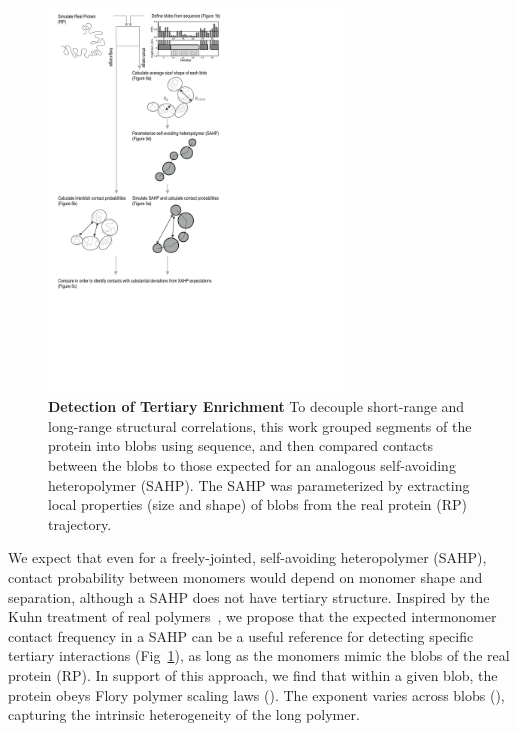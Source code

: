 \documentclass[10pt,letterpaper]{article}
\begin{document}
\begin{figure}[!ht]
\includegraphics[width=0.7\textwidth,trim={0 0cm 0 0cm},clip]{./figures/fig4.pdf}
\caption{{\bf Detection of Tertiary Enrichment } To decouple short-range and long-range structural correlations, this work grouped segments of the protein into blobs using sequence, and then compared contacts between the blobs to those expected for an analogous self-avoiding heteropolymer (SAHP). The SAHP was parameterized by extracting local properties (size and shape) of blobs from the real protein (RP) trajectory.}
\label{fig:schematic}
\end{figure}


We expect that even for a freely-jointed, self-avoiding heteropolymer (SAHP), contact probability between monomers would depend on monomer shape and separation, although a SAHP does not have tertiary structure. Inspired by the Kuhn treatment of real polymers~\cite{Rubinstein2003}, we propose that the expected intermonomer contact frequency in a SAHP can be a useful reference for detecting specific tertiary interactions (Fig~\ref{fig:schematic}), as long as the monomers mimic the blobs of the real protein (RP). In support of this approach, we find that within a given blob, the protein obeys Flory polymer scaling laws (). The exponent varies across blobs (), capturing the intrinsic heterogeneity of the long polymer.
\end{document}
